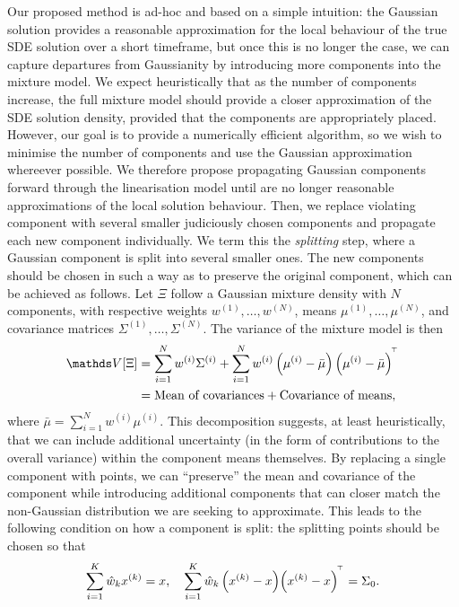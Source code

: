 Our proposed method is ad-hoc and based on a simple intuition: the Gaussian solution provides a reasonable approximation for the local behaviour of the true SDE solution over a short timeframe, but once this is no longer the case, we can capture departures from Gaussianity by introducing more components into the mixture model.
We expect heuristically that as the number of components increase, the full mixture model should provide a closer approximation of the SDE solution density, provided that the components are appropriately placed.
However, our goal is to provide a numerically efficient algorithm, so we wish to minimise the number of components and use the Gaussian approximation whereever possible.
We therefore propose propagating Gaussian components forward through the linearisation model until are no longer reasonable approximations of the local solution behaviour.
Then, we replace violating component with several smaller judiciously chosen components and propagate each new component individually.
We term this the \emph{splitting} step, where a Gaussian component is split into several smaller ones.
The new components should be chosen in such a way as to preserve the original component, which can be achieved as follows.
Let \(\Xi\) follow a Gaussian mixture density with \(N\) components, with respective weights \(w^{(1)}, \dotsc, w^{(N)}\), means \(\mu^{(1)},\dotsc,\mu^{(N)}\), and covariance matrices \(\Sigma^{(1)},\dotsc,\Sigma^{(N)}\).
The variance of the mixture model is then
\begin{align*}
	\var{\Xi} & = \sum_{i=1}^{N}{w^{(i)}\Sigma^{(i)}} + \sum_{i=1}^{N}{w^{(i)}\left(\mu^{(i)} - \bar{\mu}\right)\left(\mu^{(i)} - \bar{\mu}\right)^{\T}} \\
	          & = \text{Mean of covariances} + \text{Covariance of means},
\end{align*}
where \(\bar{\mu} = \sum_{i=1}^{N}{w^{(i)}\mu^{(i)}}\).
This decomposition suggests, at least heuristically, that we can include additional uncertainty (in the form of contributions to the overall variance) within the component means themselves.
By replacing a single component with points, we can ``preserve'' the mean and covariance of the component while introducing additional components that can closer match the non-Gaussian distribution we are seeking to approximate.
This leads to the following condition on how a component is split: the splitting points should be chosen so that
\begin{equation}
	\sum_{i=1}^K{\hat{w}_k x^{(k)}} = x, \quad \sum_{i=1}^{K}{\hat{w}_k\left(x^{(k)} - x\right)\!\left(x^{(k)} - x\right)^{^{\!\top}}} = \Sigma_0.
	\label{eqn:cov_split_points}
\end{equation}
